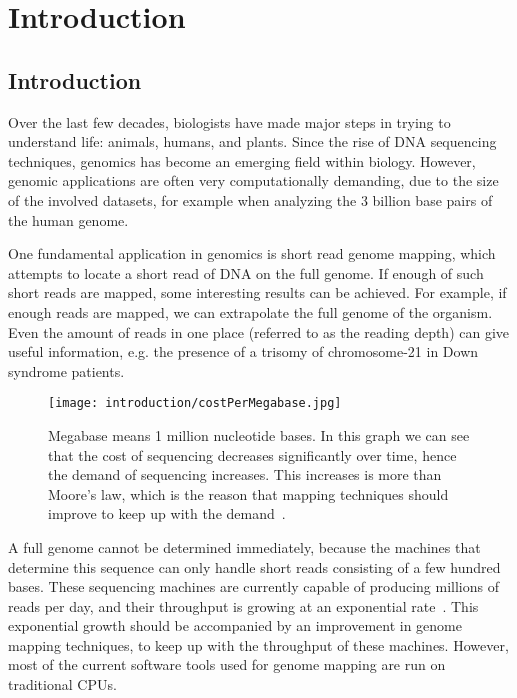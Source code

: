 
\chapter{Introduction}

\section{Introduction}
Over the last few decades, biologists have made major steps in trying to understand life: animals, humans, and plants. Since the rise of DNA sequencing techniques, genomics has become an emerging field within biology. However, genomic applications are often very computationally demanding, due to the size of the involved datasets, for example when analyzing the 3 billion base pairs of the human genome.

One fundamental application in genomics is short read genome mapping, which attempts to locate a short read of DNA on the full genome. If enough of such short reads are mapped, some interesting results can be achieved. For example, if enough reads are mapped, we can extrapolate the full genome of the organism. Even the amount of reads in one place (referred to as the reading depth) can give useful information, e.g. the presence of a trisomy of chromosome-21 in Down syndrome patients.

\begin{figure}[H]
	\centering
	\texttt{[image: introduction/costPerMegabase.jpg]}
	\caption{Megabase means 1 million nucleotide bases. In this graph we can see that the cost of sequencing decreases significantly over time, hence the demand of sequencing increases. This increases is more than Moore's law, which is the reason that mapping techniques should improve to keep up with the demand~\cite{SeqCost}.}
	\label{fig:costMb}
\end{figure}

A full genome cannot be determined immediately, because the machines that determine this sequence can only handle short reads consisting of a few hundred bases. These sequencing machines are currently capable of producing millions of reads per day, and their throughput is growing at an exponential rate~\cite{SeqCost}. This exponential growth should be accompanied by an improvement in genome mapping techniques, to keep up with the throughput of these machines. However, most of the current software tools used for genome mapping are run on traditional CPUs. 

